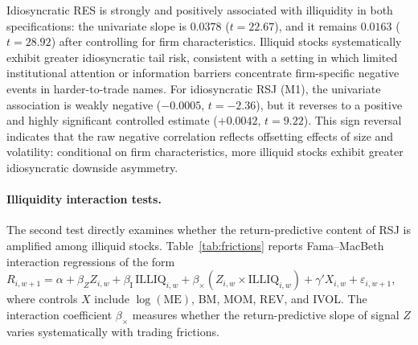 \documentclass[11pt,a4paper]{article}
\begin{document}
Idiosyncratic RES is strongly and positively associated with illiquidity in both
specifications: the univariate slope is $0.0378$ ($t=22.67$), and it remains $0.0163$
($t=28.92$) after controlling for firm characteristics. Illiquid stocks systematically
exhibit greater idiosyncratic tail risk, consistent with a setting in which limited
institutional attention or information barriers concentrate firm-specific negative events
in harder-to-trade names. For idiosyncratic RSJ (M1), the univariate association is
weakly negative ($-0.0005$, $t=-2.36$), but it reverses to a positive and highly
significant controlled estimate ($+0.0042$, $t=9.22$). This sign reversal indicates
that the raw negative correlation reflects offsetting effects of size and volatility:
conditional on firm characteristics, more illiquid stocks exhibit greater idiosyncratic
downside asymmetry.

\paragraph{Illiquidity interaction tests.}
The second test directly examines whether the return-predictive content of RSJ is
amplified among illiquid stocks. Table~\ref{tab:frictions} reports Fama--MacBeth
interaction regressions of the form $R_{i,w+1} = \alpha + \beta_Z Z_{i,w}
+ \beta_\text{I}\,\text{ILLIQ}_{i,w} + \beta_\times (Z_{i,w} \times \text{ILLIQ}_{i,w})
+ \gamma' X_{i,w} + \varepsilon_{i,w+1}$, where controls $X$ include $\log(\text{ME})$,
BM, MOM, REV, and IVOL. The interaction coefficient $\beta_\times$ measures whether the
return-predictive slope of signal $Z$ varies systematically with trading frictions.
\end{document}
